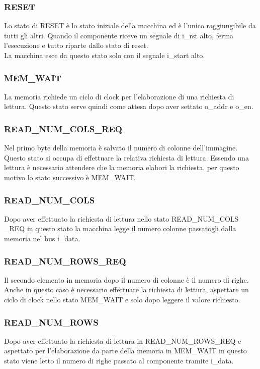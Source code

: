 \documentclass{article}
\begin{document}
\subsubsection{RESET}
Lo stato di RESET è lo stato iniziale della macchina ed è l'unico raggiungibile da tutti gli altri. Quando il componente riceve un segnale di i\_rst alto, ferma l'esecuzione e tutto riparte dallo stato di reset.\\
La macchina esce da questo stato solo con il segnale i\_start alto.

\subsubsection{MEM\_WAIT}
La memoria richiede un ciclo di clock per l'elaborazione di una richiesta di lettura. Questo stato serve quindi come attesa dopo aver settato o\_addr e o\_en.

\subsubsection{READ\_NUM\_COLS\_REQ}
Nel primo byte della memoria è salvato il numero di colonne dell'immagine. Questo stato si occupa di effettuare la relativa richiesta di lettura. Essendo una lettura è necessario attendere che la memoria elabori la richiesta, per questo motivo lo stato successivo è MEM\_WAIT.

\subsubsection{READ\_NUM\_COLS}
Dopo aver effettuato la richiesta di lettura nello stato READ\_NUM\_COLS\\\_REQ in questo stato la macchina legge il numero colonne passatogli dalla memoria nel bus i\_data.

\subsubsection{READ\_NUM\_ROWS\_REQ}
Il secondo elemento in memoria dopo il numero di colonne è il numero di righe. Anche in questo caso è necessario effettuare la richiesta di lettura, aspettare un ciclo di clock nello stato MEM\_WAIT e solo dopo leggere il valore richiesto.

\subsubsection{READ\_NUM\_ROWS}
Dopo aver effettuato la richiesta di lettura in READ\_NUM\_ROWS\_REQ e aspettato per l'elaborazione da parte della memoria in MEM\_WAIT in questo stato viene letto il numero di righe passato al componente tramite i\_data.
\end{document}
